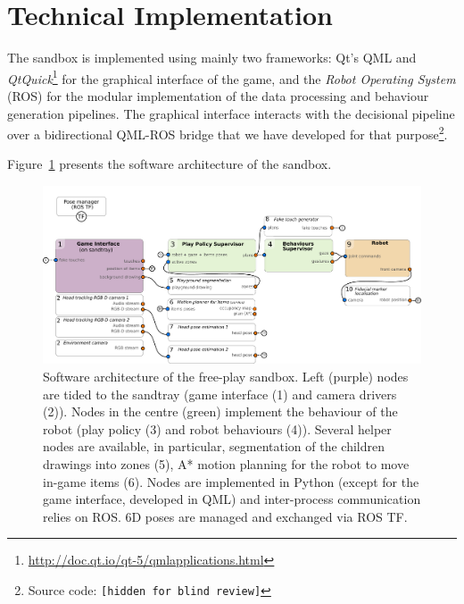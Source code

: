 \documentclass[sigconf]{acmart}
\begin{document}
\section{Technical Implementation}
\label{sec:impl}

The sandbox is implemented using mainly two frameworks: Qt's QML and
\emph{QtQuick}\footnote{\url{http://doc.qt.io/qt-5/qmlapplications.html}}
for the graphical interface of the game, and the \emph{Robot Operating System}
(ROS) for the modular implementation of the data processing and behaviour
generation pipelines. The graphical interface interacts with the decisional
pipeline over a bidirectional QML-ROS bridge that we have developed for that
purpose\footnote{Source code: \texttt{[hidden for blind review]}}.


Figure~\ref{fig|architecture} presents the software architecture of the sandbox.

\begin{figure}
    \centering
    \includegraphics[width=\linewidth]{freeplay-sandbox-architecture}
    \caption{Software architecture of the free-play sandbox. Left (purple) nodes
    are tided to the sandtray (game interface (1) and camera drivers (2)). Nodes in the
    centre (green) implement the behaviour of the robot (play policy (3) and robot
    behaviours (4)). Several helper nodes are available, in particular, segmentation of the
    children drawings into zones (5), A* motion planning for the robot to move
    in-game items (6). Nodes are implemented in
    Python (except for the game interface, developed in QML) and inter-process
    communication relies on ROS. 6D poses are managed and exchanged via ROS TF.}

    \label{fig|architecture}
\end{figure}
\end{document}
